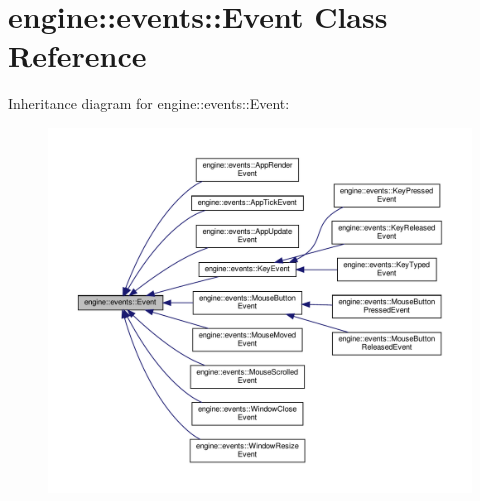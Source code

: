 \hypertarget{classengine_1_1events_1_1Event}{}\section{engine\+:\+:events\+:\+:Event Class Reference}
\label{classengine_1_1events_1_1Event}


Inheritance diagram for engine\+:\+:events\+:\+:Event\+:\nopagebreak
\begin{figure}[H]
\begin{center}
\leavevmode
\includegraphics[width=350pt]{classengine_1_1events_1_1Event__inherit__graph}
\end{center}
\end{figure}
